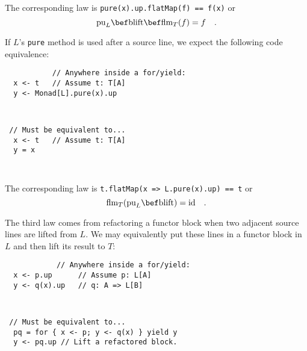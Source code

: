 The corresponding law is \lstinline!pure(x).up.flatMap(f) == f(x)!
or 
\[
\text{pu}_{L}\bef\text{blift}\bef\text{flm}_{T}(f)=f\quad.
\]

If $L$\textsf{'}s \lstinline!pure! method is used after a source line, we
expect the following code equivalence:

\vspace{-0.5\baselineskip}

\noindent \texttt{\textcolor{blue}{\footnotesize{}}}%
\begin{minipage}[t]{0.48\columnwidth}%
\textcolor{darkgray}{\footnotesize{}}
\begin{lstlisting}
           // Anywhere inside a for/yield:
  x <- t   // Assume t: T[A]
  y <- Monad[L].pure(x).up
\end{lstlisting}
%
\end{minipage}\texttt{\textcolor{blue}{\footnotesize{}\hspace*{\fill} }}%
\begin{minipage}[t]{0.48\columnwidth}%
\texttt{\textcolor{blue}{\footnotesize{}}}
\begin{lstlisting}
 // Must be equivalent to...
  x <- t   // Assume t: T[A]
  y = x
\end{lstlisting}
%
\end{minipage}\texttt{\textcolor{blue}{\footnotesize{}\smallskip{}
}}{\footnotesize\par}

The corresponding law is \lstinline!t.flatMap(x => L.pure(x).up) == t!
or 
\[
\text{flm}_{T}(\text{pu}_{L}\bef\text{blift})=\text{id}\quad.
\]

The third law comes from refactoring a functor block when two adjacent
source lines are lifted from $L$. We may equivalently put these lines
in a functor block in $L$ and then lift its result to $T$:

\vspace{-0.4\baselineskip}

\noindent \texttt{\textcolor{blue}{\footnotesize{}}}%
\begin{minipage}[t]{0.48\columnwidth}%
\textcolor{darkgray}{\footnotesize{}}
\begin{lstlisting}
            // Anywhere inside a for/yield:
  x <- p.up      // Assume p: L[A]
  y <- q(x).up   // q: A => L[B]
\end{lstlisting}
%
\end{minipage}\texttt{\textcolor{blue}{\footnotesize{}\hspace*{\fill} }}%
\begin{minipage}[t]{0.48\columnwidth}%
\texttt{\textcolor{blue}{\footnotesize{}}}
\begin{lstlisting}
 // Must be equivalent to...
  pq = for { x <- p; y <- q(x) } yield y
  y <- pq.up // Lift a refactored block.
\end{lstlisting}
%
\end{minipage}\texttt{\textcolor{blue}{\footnotesize{}\smallskip{}
}}{\footnotesize\par}

